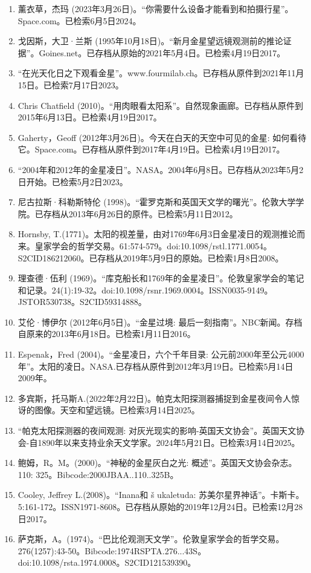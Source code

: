 \begin{enumerate}
\item 薰衣草，杰玛 (2023年3月26日)。“你需要什么设备才能看到和拍摄行星”。Space.com。已检索6月5日2024。
\item 戈因斯，大卫·兰斯 (1995年10月18日)。“新月金星望远镜观测前的推论证据”。Goines.net。已存档从原始的2021年5月4日。已检索4月19日2017。
\item “在光天化日之下观看金星”。www.fourmilab.ch。已存档从原件到2021年11月15日。已检索7月17日2023。
\item Chris Chatfield (2010)。“用肉眼看太阳系”。自然现象画廊。已存档从原件到2015年6月13日。已检索4月19日2017。
\item Gaherty，Geoff (2012年3月26日)。今天在白天的天空中可见的金星: 如何看待它。Space.com。已存档从原件到2017年4月19日。已检索4月19日2017。
\item “2004年和2012年的金星凌日”。NASA。2004年6月8日。已存档从2023年5月2日开始。已检索5月2日2023。
\item 尼古拉斯·科勒斯特伦 (1998)。“霍罗克斯和英国天文学的曙光”。伦敦大学学院。已存档从2013年6月26日的原件。已检索5月11日2012。
\item Hornsby, T.(1771)。太阳的视差量，由对1769年6月3日金星凌日的观测推论而来。皇家学会的哲学交易。61:574-579。doi:10.1098/rstl.1771.0054。S2CID186212060。已存档从2019年5月9日的原始。已检索1月8日2008。 
\item 理查德·伍利 (1969)。“库克船长和1769年的金星凌日”。伦敦皇家学会的笔记和记录。24(1):19-32。doi:10.1098/rsnr.1969.0004。ISSN0035-9149。JSTOR530738。S2CID59314888。   
\item 艾伦·博伊尔 (2012年6月5日)。“金星过境: 最后一刻指南”。NBC新闻。存档自原来的2013年6月18日。已检索1月11日2016。
\item Espenak，Fred (2004)。“金星凌日，六个千年目录: 公元前2000年至公元4000年”。太阳的凌日。NASA.已存档从原件到2012年3月19日。已检索5月14日2009年。
\item 多宾斯，托马斯A.(2022年2月22日)。帕克太阳探测器捕捉到金星夜间令人惊讶的图像。天空和望远镜。已检索3月14日2025。
\item “帕克太阳探测器的夜间观测: 对灰光现实的影响-英国天文协会”。英国天文协会-自1890年以来支持业余天文学家。2024年5月21日。已检索3月14日2025。
\item 鲍姆，R。M。(2000)。“神秘的金星灰白之光: 概述”。英国天文协会杂志。110: 325。Bibcode:2000JBAA..110..325B。
\item Cooley, Jeffrey L.(2008)。“Inana和 š ukaletuda: 苏美尔星界神话”。卡斯卡。5:161-172。ISSN1971-8608。已存档从原始的2019年12月24日。已检索12月28日2017。 
\item 萨克斯，A。(1974)。“巴比伦观测天文学”。伦敦皇家学会的哲学交易。276(1257):43-50。Bibcode:1974RSPTA.276...43S。doi:10.1098/rsta.1974.0008。S2CID121539390。 

\end{enumerate}
